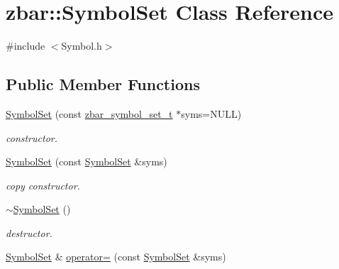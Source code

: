 \hypertarget{classzbar_1_1_symbol_set}{
\section{zbar::SymbolSet Class Reference}
\label{classzbar_1_1_symbol_set}
}


{\ttfamily \#include $<$Symbol.h$>$}

\subsection*{Public Member Functions}
\begin{DoxyCompactItemize}
\item 
\hypertarget{classzbar_1_1_symbol_set_a9e066c74c856cf7a0278404da0aef095}{
\hyperlink{classzbar_1_1_symbol_set_a9e066c74c856cf7a0278404da0aef095}{SymbolSet} (const \hyperlink{zbar_8h_a80376ce7ea64e9a96e9d73b6e9f600d0}{zbar\_\-symbol\_\-set\_\-t} $\ast$syms=NULL)}
\label{classzbar_1_1_symbol_set_a9e066c74c856cf7a0278404da0aef095}

\begin{DoxyCompactList}\small\item\em constructor. \end{DoxyCompactList}\item 
\hypertarget{classzbar_1_1_symbol_set_ae80c81494d9fb5c6120dc74927b3c0e9}{
\hyperlink{classzbar_1_1_symbol_set_ae80c81494d9fb5c6120dc74927b3c0e9}{SymbolSet} (const \hyperlink{classzbar_1_1_symbol_set}{SymbolSet} \&syms)}
\label{classzbar_1_1_symbol_set_ae80c81494d9fb5c6120dc74927b3c0e9}

\begin{DoxyCompactList}\small\item\em copy constructor. \end{DoxyCompactList}\item 
\hypertarget{classzbar_1_1_symbol_set_af175f170848ea699ef7b599c6825bb1a}{
\hyperlink{classzbar_1_1_symbol_set_af175f170848ea699ef7b599c6825bb1a}{$\sim$SymbolSet} ()}
\label{classzbar_1_1_symbol_set_af175f170848ea699ef7b599c6825bb1a}

\begin{DoxyCompactList}\small\item\em destructor. \end{DoxyCompactList}\item 
\hypertarget{classzbar_1_1_symbol_set_acb92ce325f839b74b376f44a84cf8ab2}{
\hyperlink{classzbar_1_1_symbol_set}{SymbolSet} \& \hyperlink{classzbar_1_1_symbol_set_acb92ce325f839b74b376f44a84cf8ab2}{operator=} (const \hyperlink{classzbar_1_1_symbol_set}{SymbolSet} \&syms)}
\label{classzbar_1_1_symbol_set_acb92ce325f839b74b376f44a84cf8ab2}


\end{DoxyCompactItemize}
